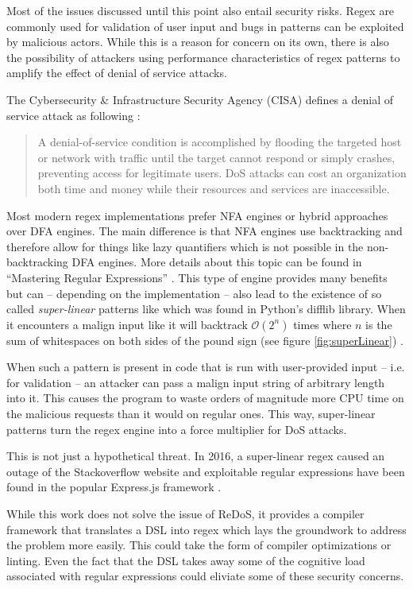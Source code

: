 Most of the issues discussed until this point also entail security risks. Regex are commonly used for validation of user input and bugs in patterns can be exploited by malicious actors. While this is a reason for concern on its own, there is also the possibility of attackers using performance characteristics of regex patterns to amplify the effect of denial of service attacks.

The Cybersecurity \& Infrastructure Security Agency (CISA) defines a denial of service attack as following \cite{DenialOfService}:

{\small
\begin{quote}
A denial-of-service condition is accomplished by flooding the targeted host or network with traffic until the target cannot respond or simply crashes, preventing access for legitimate users. DoS attacks can cost an organization both time and money while their resources and services are inaccessible.
\end{quote}
}

Most modern regex implementations prefer NFA engines or hybrid approaches over DFA engines. The main difference is that NFA engines use backtracking and therefore allow for things like lazy quantifiers which is not possible in the non-backtracking DFA engines. More details about this topic can be found in \enquote{Mastering Regular Expressions} \cite{MasteringRegex}. This type of engine provides many benefits but can -- depending on the implementation -- also lead to the existence of so called \emph{super-linear} patterns like  which was found in Python's difflib library. When it encounters a malign input like  it will backtrack $\mathcal{O}(2^n)$ times where $n$ is the sum of whitespaces on both sides of the pound sign (see figure \ref{fig:superLinear}) \cite{RedosInPractice}.

When such a pattern is present in code that is run with user-provided input -- i.e. for validation -- an attacker can pass a malign input string of arbitrary length into it. This causes the program to waste orders of magnitude more CPU time on the malicious requests than it would on regular ones. This way, super-linear patterns turn the regex engine into a force multiplier for DoS attacks.

This is not just a hypothetical threat. In 2016, a super-linear regex caused an outage of the Stackoverflow website \cite{RedosStackOverflowOutage} and exploitable regular expressions have been found in the popular Express.js framework \cite{RedosExpressJs}.

While this work does not solve the issue of ReDoS, it provides a compiler framework that translates a DSL into regex which lays the groundwork to address the problem more easily. This could take the form of compiler optimizations or linting. Even the fact that the DSL takes away some of the cognitive load associated with regular expressions could eliviate some of these security concerns.


